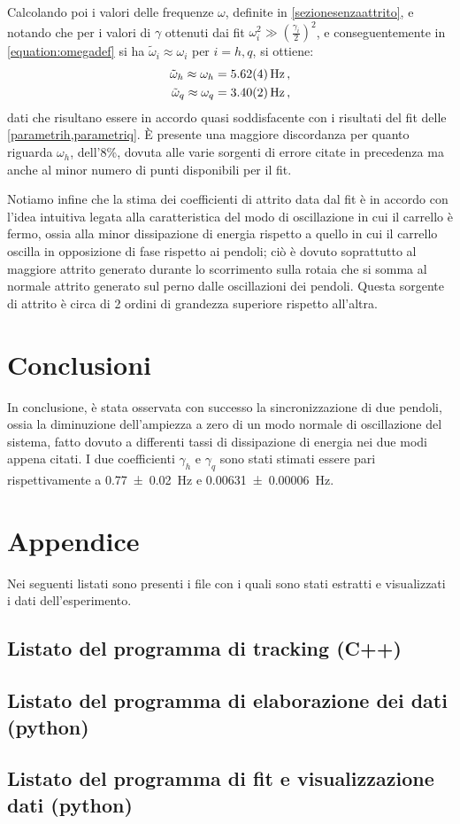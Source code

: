 \documentclass[11pt, a4paper, twoside, italian]{article}
\begin{document}
Calcolando poi i valori delle frequenze $\omega$, definite in \cref{sezionesenzaattrito},
e notando che per i valori di $\gamma$ ottenuti dai fit 
$\omega_i^2 \gg \left( \frac{\gamma_i}{2} \right)^2$, e conseguentemente in
\cref{equation:omegadef} si ha $ \tilde{\omega}_i \approx \omega_i$ per $i=h,q$,
si ottiene:
\begin{align*}
\tilde{\omega}_h \approx \omega_h = \SI{5.62 \pm 0.04}{\hertz} \, , \\
\tilde{\omega}_q \approx \omega_q = \SI{3.40 \pm 0.02}{\hertz} \, ,
\end{align*}
dati che risultano essere in accordo quasi soddisfacente con i risultati del fit delle \cref{parametrih,parametriq}.
È presente una maggiore discordanza per quanto riguarda $\omega_h$, dell'8\%, dovuta 
alle varie sorgenti di errore citate in precedenza ma anche al minor numero di punti disponibili
per il fit.

Notiamo infine che la stima dei coefficienti di attrito data dal fit è in accordo 
con l'idea intuitiva legata alla caratteristica del modo di oscillazione in cui il carrello 
è fermo, ossia alla minor dissipazione di energia rispetto a quello in cui il carrello oscilla in opposizione di 
fase rispetto ai pendoli; ciò è dovuto soprattutto al maggiore attrito generato
durante lo scorrimento sulla rotaia che si somma al normale attrito generato sul perno 
dalle oscillazioni dei pendoli. Questa sorgente di attrito è circa di 2 ordini di grandezza superiore 
rispetto all'altra.
\section{Conclusioni}
In conclusione, è stata osservata con successo la sincronizzazione di due pendoli, ossia la 
 diminuzione dell'ampiezza a zero di un modo normale di oscillazione del sistema, fatto dovuto a differenti
tassi di dissipazione di energia nei due modi appena citati. I due coefficienti $\gamma_h$ 
e $\gamma_q$ sono stati stimati essere pari rispettivamente a \SI{0.77 \pm 0.02}{\hertz} e 
\SI{0.00631 \pm 0.00006}{\hertz}.

\section{Appendice}
Nei seguenti listati sono presenti i file con i quali sono stati estratti 
e visualizzati i dati dell'esperimento.
\subsection{Listato del programma di tracking (C++)}

\label{listatocpp}
\subsection{Listato del programma di elaborazione dei dati (python)}

\label{listatoavg}
\subsection{Listato del programma di fit e visualizzazione dati (python)}

\label{listatoplotter}
\end{document}
